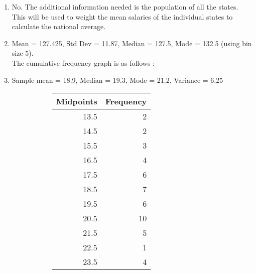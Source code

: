 \begin{enumerate}
\begin{subequations}
		This is a quadratic system of equations with the solution $ x_4 = 110.4 $ and $ x_5 = 102.6 $. \\
	\end{subequations}
	
	\item No. The additional information needed is the population of all the states. This will be used to weight the mean salaries of the individual states to calculate the national average.
	
	\item Mean = 127.425, Std Dev = 11.87, Median = 127.5, Mode = 132.5 (using bin size 5). \\
	The cumulative frequency graph is as follows : 
	
	
	\item Sample mean = 18.9, Median = 19.3, Mode = 21.2, Variance =  6.25\\
	\begin{figure}[H]
		\centering
		
	\end{figure}
	
	\begin{figure}[H]
		\begin{subfigure}[]{0.45\linewidth}
			\centering
			\begin{table}[H]
				\centering
				\begin{tabular}{rr}
					\toprule
					Midpoints &  Frequency \\
					\midrule
					13.5 &          2 \\
					14.5 &          2 \\
					15.5 &          3 \\
					16.5 &          4 \\
					17.5 &          6 \\
					18.5 &          7 \\
					19.5 &          6 \\
					20.5 &         10 \\
					21.5 &          5 \\
					22.5 &          1 \\
					23.5 &          4 \\
					\bottomrule
				\end{tabular}
			\end{table}
		\end{subfigure}
		\begin{subfigure}[]{0.45\linewidth}
			\centering
		\end{subfigure} \\		
	\end{figure}
	

\end{enumerate}
